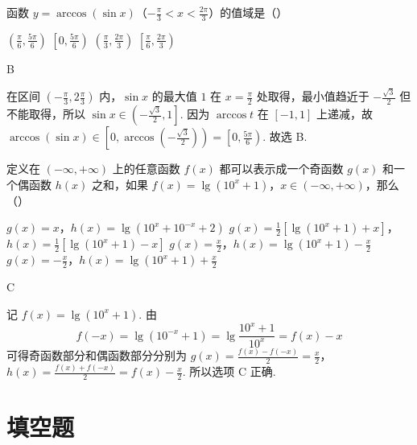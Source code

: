 \documentclass[UTF8,a4paper,oneside,11pt]{ctexbook}
\begin{document}
\begin{problem}
函数 \(y = \arccos (\sin x)\)（\(-\frac{\pi}{3} < x < \frac{2\pi}{3}\)）的值域是（\quad）

\choices
    {\(\left(\frac{\pi}{6}, \frac{5\pi}{6}\right)\)}
    {\(\left[0, \frac{5\pi}{6}\right)\)}
    {\(\left(\frac{\pi}{3}, \frac{2\pi}{3}\right)\)}
    {\(\left[\frac{\pi}{6}, \frac{2\pi}{3}\right)\)}
\end{problem}

\begin{answer}
B
\end{answer}

\begin{solution}
在区间 \(\left(-\frac{\pi}{3},2\frac{\pi}{3}\right)\) 内，\(\sin x\) 的最大值 \(1\) 在 \(x=\frac{\pi}{2}\) 处取得，最小值趋近于 \(-\frac{\sqrt{3}}{2}\) 但不能取得，所以 \(\sin x\in\left(-\frac{\sqrt{3}}{2},1\right]\).
因为 \(\arccos t\) 在 \([-1,1]\) 上递减，故
\(\arccos(\sin x)\in\left[0,\arccos\left(-\frac{\sqrt{3}}{2}\right)\right)=\left[0,\frac{5\pi}{6}\right)\).
故选 B.
\end{solution}

\begin{problem}
定义在 \((- \infty, + \infty)\) 上的任意函数 \(f(x)\) 都可以表示成一个奇函数 \(g(x)\) 和一个偶函数 \(h(x)\) 之和，如果 \(f(x) = \lg \left(10^x + 1\right)\)，\(x \in (-\infty, +\infty)\)，那么（\quad）

\choices
    {\(g(x) = x\)，\(h(x) = \lg \left(10^x + 10^{-x} + 2\right)\)}
    {\(g(x) = \frac{1}{2}\left[\lg \left(10^x + 1\right) + x\right]\)，\(h(x) = \frac{1}{2}\left[\lg \left(10^x + 1\right) - x\right]\)}
    {\(g(x) = \frac{x}{2}\)，\(h(x) = \lg \left(10^x + 1\right) - \frac{x}{2}\)}
    {\(g(x) = -\frac{x}{2}\)，\(h(x) = \lg \left(10^x + 1\right) + \frac{x}{2}\)}
\end{problem}

\begin{answer}
C
\end{answer}

\begin{solution}
记 \(f(x)=\lg(10^x+1)\). 由
\[
f(-x)=\lg(10^{-x}+1)=\lg\frac{10^x+1}{10^x}=f(x)-x
\]
可得奇函数部分和偶函数部分分别为 \(g(x)=\frac{f(x)-f(-x)}{2}=\frac{x}{2}\)，\(h(x)=\frac{f(x)+f(-x)}{2}=f(x)-\frac{x}{2}\).
所以选项 C 正确.
\end{solution}

\section{填空题}
\end{document}
